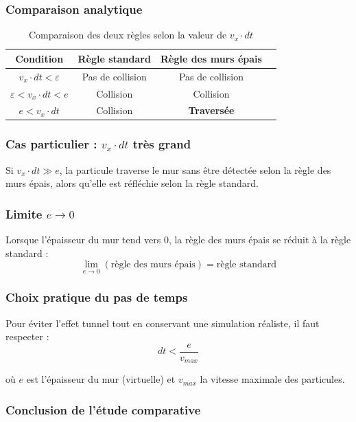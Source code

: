 \documentclass[12pt,a4paper]{report}
\begin{document}
\subsubsection{Comparaison analytique}

\begin{table}[h]
\centering
\begin{tabular}{|c|c|c|c|}
\hline
Condition & Règle standard & Règle des murs épais \\
\hline
$v_x \cdot dt < \varepsilon$ & Pas de collision & Pas de collision \\
$\varepsilon < v_x \cdot dt < e$ & Collision & Collision \\
$e < v_x \cdot dt$ & Collision & \textbf{Traversée} \\
\hline
\end{tabular}
\caption{Comparaison des deux règles selon la valeur de $v_x \cdot dt$}
\end{table}

\subsubsection{Cas particulier : $v_x \cdot dt$ très grand}

Si $v_x \cdot dt \gg e$, la particule traverse le mur sans être détectée selon la règle des murs épais, alors qu'elle est réfléchie selon la règle standard.

\subsubsection{Limite $e \to 0$}

Lorsque l'épaisseur du mur tend vers $0$, la règle des murs épais se réduit à la règle standard :
\[
\lim_{e \to 0} \left( \text{règle des murs épais} \right) = \text{règle standard}
\]

\subsubsection{Choix pratique du pas de temps}

Pour éviter l'effet tunnel tout en conservant une simulation réaliste, il faut respecter :
\[
\boxed{dt < \frac{e}{v_{max}}}
\]

où $e$ est l'épaisseur du mur (virtuelle) et $v_{max}$ la vitesse maximale des particules.

\subsubsection{Conclusion de l'étude comparative}
\end{document}
